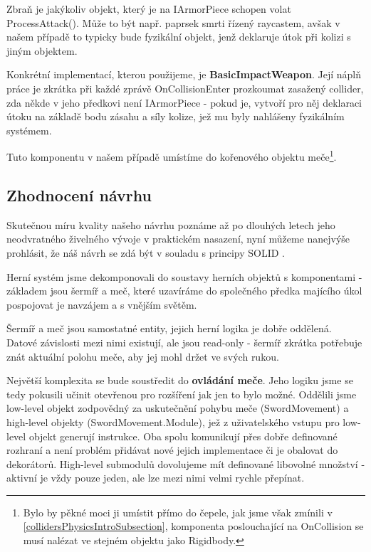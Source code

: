 Zbraň je jakýkoliv objekt, který je na IArmorPiece schopen volat ProcessAttack(). Může to být např. paprsek smrti řízený raycastem, avšak v našem případě to typicky bude fyzikální objekt, jenž deklaruje útok při kolizi s jiným objektem. 

Konkrétní implementací, kterou použijeme, je \textbf{BasicImpactWeapon}. Její náplň práce je zkrátka při každé zprávě OnCollisionEnter prozkoumat zasažený collider, zda někde v jeho předkovi není IArmorPiece - pokud je, vytvoří pro něj deklaraci útoku na základě bodu zásahu a síly kolize, jež mu byly nahlášeny fyzikálním systémem. 

Tuto komponentu v našem případě umístíme do kořenového objektu meče\footnote{Bylo by pěkné moci ji umístit přímo do čepele, jak jsme však zmínili v \ref{collidersPhysicsIntroSubsection}, komponenta poslouchající na OnCollision se musí nalézat ve stejném objektu jako Rigidbody. }.



\subsection{Zhodnocení návrhu} 

Skutečnou míru kvality našeho návrhu poznáme až po dlouhých letech jeho neodvratného živelného vývoje v praktickém nasazení, nyní můžeme nanejvýše prohlásit, že náš návrh se zdá být v souladu s principy SOLID \cite{CleanArchitectureSOLID}. 

Herní systém jsme dekomponovali do soustavy herních objektů s komponentami - základem jsou šermíř a meč, které uzavíráme do společného předka majícího úkol pospojovat je navzájem a s vnějším světěm. 

Šermíř a meč jsou samostatné entity, jejich herní logika je dobře oddělená. Datové závislosti mezi nimi existují, ale jsou read-only - šermíř zkrátka potřebuje znát aktuální polohu meče, aby jej mohl držet ve svých rukou.

Největší komplexita se bude soustředit do \textbf{ovládání meče}. Jeho logiku jsme se tedy pokusili učinit otevřenou pro rozšíření jak jen to bylo možné. Oddělili jsme low-level objekt zodpovědný za uskutečnění pohybu meče (SwordMovement) a high-level objekty (SwordMovement.Module), jež z uživatelského vstupu pro low-level objekt generují instrukce. Oba spolu komunikují přes dobře definované rozhraní a není problém přidávat nové jejich implementace či je obalovat do dekorátorů. High-level submodulů dovolujeme mít definované libovolné množství - aktivní je vždy pouze jeden, ale lze mezi nimi velmi rychle přepínat. 

